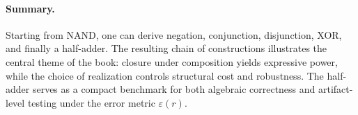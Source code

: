 \paragraph{Summary.}
Starting from NAND, one can derive negation, conjunction, disjunction, XOR, and finally a half-adder. The resulting chain of constructions illustrates the central theme of the book: closure under composition yields expressive power, while the choice of realization controls structural cost and robustness. The half-adder serves as a compact benchmark for both algebraic correctness and artifact-level testing under the error metric \(\varepsilon(r)\).
